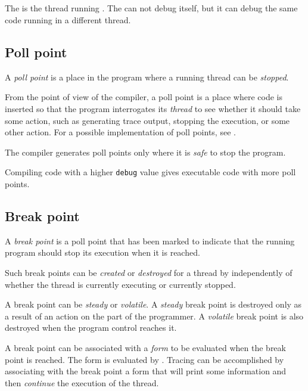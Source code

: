 \subsection{\Debuggerthread{}}

The \debuggerthread{} is the thread running \sysname{}.  The
\debuggerthread{} can not debug itself, but it can debug the same code
running in a different thread.

%
\def\Pollpoint{Poll point}%
\def\pollpoint{poll point}%
\def\pollpoints{poll points}%
\subsection{\Pollpoint{}}

A \emph{\pollpoint{}} is a place in the program where a running thread
can be \emph{stopped}.

From the point of view of the compiler, a \pollpoint{} is a place
where code is inserted so that the program interrogates its
\emph{thread} to see whether it should take some action, such as
generating trace output, stopping the execution, or some other action.
For a possible implementation of poll points, see
.

The compiler generates \pollpoints{} only where it is \emph{safe} to
stop the program.

Compiling code with a higher \texttt{debug} value gives executable
code with more \pollpoints{}.

%
\def\Breakpoint{Break point}%
\def\breakpoint{break point}%
\def\breakpoints{break points}%
\subsection{\Breakpoint{}}

A \emph{\breakpoint{}} is a \pollpoint{} that has been marked to indicate
that the running program should stop its execution when it is
reached.

Such \breakpoints{} can be \emph{created} or \emph{destroyed} for a
thread by \sysname{} independently of whether the thread is currently
executing or currently stopped.

A \breakpoint{} can be \emph{steady} or \emph{volatile}.  A
\emph{steady} \breakpoint{} is destroyed only as a result of an action
on the part of the programmer.  A \emph{volatile} \breakpoint{} is
also destroyed when the program control reaches it.

A \breakpoint{} can be associated with a \commonlisp{} \emph{form} to
be evaluated when the \breakpoint{} is reached.  The form is evaluated
by \sysname{}.  Tracing can be accomplished by associating with the
\breakpoint{} a form that will print some information and then
\emph{continue} the execution of the thread.

